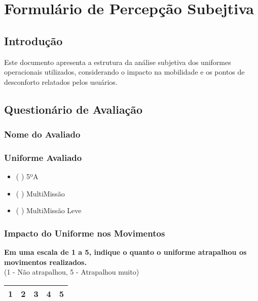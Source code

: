 \chapter{Formulário de Percepção Subejtiva}
\label{ap:formulario}
\section{Introdução}
Este documento apresenta a estrutura da análise subjetiva dos uniformes operacionais utilizados, considerando o impacto na mobilidade e os pontos de desconforto relatados pelos usuários.

\section{Questionário de Avaliação}

\subsection{Nome do Avaliado}
\vspace{2cm}
\subsection{Uniforme Avaliado}

    \begin{itemize}
        \item ( ) 5ºA
        \item ( ) MultiMissão
        \item ( ) MultiMissão Leve
    \end{itemize}


\subsection{Impacto do Uniforme nos Movimentos}
\textbf{Em uma escala de 1 a 5, indique o quanto o uniforme atrapalhou os movimentos realizados.}\\
(1 - Não atrapalhou, 5 - Atrapalhou muito)

\begin{center}
    \begin{tabular}{|c|c|c|c|c|}
        \hline
        1 & 2 & 3 & 4 & 5 \\
        \hline
    \end{tabular}
\end{center}

